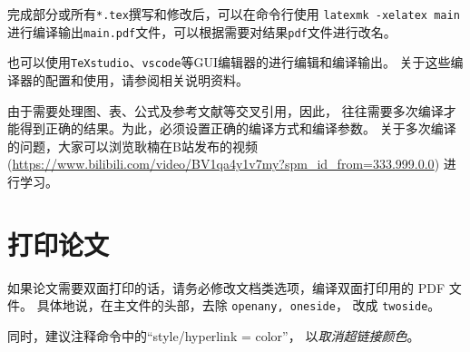 完成部分或所有\verb|*.tex|撰写和修改后，可以在命令行使用 \verb|latexmk -xelatex main|
进行编译输出\verb|main.pdf|文件，可以根据需要对结果\texttt{pdf}文件进行改名。

也可以使用\texttt{TeXstudio}、\texttt{vscode}等GUI编辑器的进行编辑和编译输出。
关于这些编译器的配置和使用，请参阅相关说明资料。

\note{}由于\nwafuthesis{}需要处理图、表、公式及参考文献等交叉引用，因此，
往往需要多次编译才能得到正确的结果。为此，必须设置正确的编译方式和编译参数。
关于多次编译的问题，大家可以浏览耿楠在B站发布的视频
(\url{https://www.bilibili.com/video/BV1qa4y1v7my?spm_id_from=333.999.0.0})
进行学习。

\section{打印论文}

如果论文需要双面打印的话，请务必修改文档类选项，编译双面打印用的 PDF 文件。
具体地说，在主文件的头部，去除 \texttt{openany, oneside}，
改成 \texttt{twoside}。

同时，建议注释命令中的\enquote{style/hyperlink = color}，
以\emph{取消超链接颜色}。

